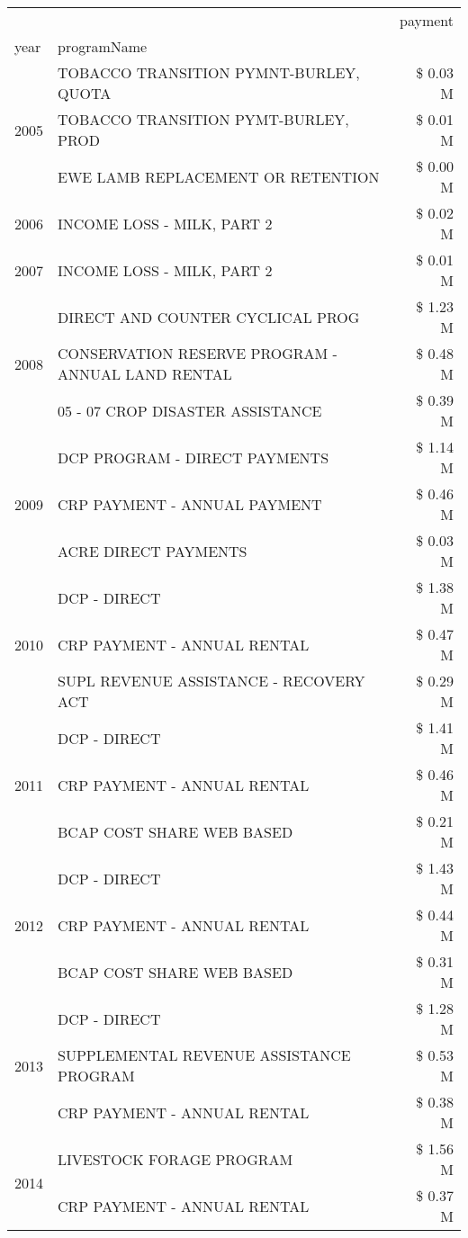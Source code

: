 \begin{tabular}{llr}
\toprule
 &  & payment \\
year & programName &  \\
\midrule
\multirow[t]{3}{*}{2005} & TOBACCO TRANSITION PYMNT-BURLEY, QUOTA & \$ 0.03 M \\
 & TOBACCO TRANSITION PYMT-BURLEY, PROD & \$ 0.01 M \\
 & EWE LAMB REPLACEMENT OR RETENTION & \$ 0.00 M \\
\cline{1-3}
2006 & INCOME LOSS - MILK, PART 2 & \$ 0.02 M \\
\cline{1-3}
2007 & INCOME LOSS - MILK, PART 2 & \$ 0.01 M \\
\cline{1-3}
\multirow[t]{3}{*}{2008} & DIRECT AND COUNTER CYCLICAL PROG & \$ 1.23 M \\
 & CONSERVATION RESERVE PROGRAM - ANNUAL LAND RENTAL & \$ 0.48 M \\
 & 05 - 07 CROP DISASTER ASSISTANCE & \$ 0.39 M \\
\cline{1-3}
\multirow[t]{3}{*}{2009} & DCP PROGRAM - DIRECT PAYMENTS & \$ 1.14 M \\
 & CRP PAYMENT - ANNUAL PAYMENT & \$ 0.46 M \\
 & ACRE DIRECT PAYMENTS & \$ 0.03 M \\
\cline{1-3}
\multirow[t]{3}{*}{2010} & DCP - DIRECT & \$ 1.38 M \\
 & CRP PAYMENT - ANNUAL RENTAL & \$ 0.47 M \\
 & SUPL REVENUE ASSISTANCE - RECOVERY ACT & \$ 0.29 M \\
\cline{1-3}
\multirow[t]{3}{*}{2011} & DCP - DIRECT & \$ 1.41 M \\
 & CRP PAYMENT - ANNUAL RENTAL & \$ 0.46 M \\
 & BCAP COST SHARE WEB BASED & \$ 0.21 M \\
\cline{1-3}
\multirow[t]{3}{*}{2012} & DCP - DIRECT & \$ 1.43 M \\
 & CRP PAYMENT - ANNUAL RENTAL & \$ 0.44 M \\
 & BCAP COST SHARE WEB BASED & \$ 0.31 M \\
\cline{1-3}
\multirow[t]{3}{*}{2013} & DCP - DIRECT & \$ 1.28 M \\
 & SUPPLEMENTAL REVENUE ASSISTANCE PROGRAM & \$ 0.53 M \\
 & CRP PAYMENT - ANNUAL RENTAL & \$ 0.38 M \\
\cline{1-3}
\multirow[t]{3}{*}{2014} & LIVESTOCK FORAGE PROGRAM & \$ 1.56 M \\
 & CRP PAYMENT - ANNUAL RENTAL & \$ 0.37 M \\

\end{tabular}

